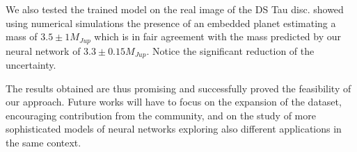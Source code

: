 \documentclass[a4paper,10pt, margin=1cm]{article}
\begin{document}
We also tested the trained model on the real image of the DS Tau disc. \cite{dstauv} showed using numerical simulations
the presence of an embedded planet estimating a mass of $3.5\pm1M_{Jup}$ which is in fair agreement with the mass predicted by our neural network of $3.3\pm0.15M_{Jup}$.
Notice the significant reduction of the uncertainty.

The results obtained are thus promising and successfully proved the feasibility 
of our approach. 
Future works will have to focus on the expansion of the dataset, encouraging contribution from the community,
and on the study of more sophisticated models 
of neural networks exploring also different applications in the same context. 


\end{document}
